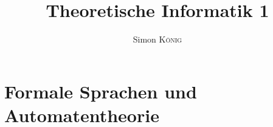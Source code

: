 \documentclass[orange]{simonkoenigzusammenfassung}
\title{Theoretische Informatik 1\\\subtitleformat{Zusammenfassung zum Modul Formale Sprachen und Automatentheorie}}
\author{Simon \textsc{König}}
\begin{document}
\maketitle
\tableofcontents

\part{Formale Sprachen und Automatentheorie}

\end{document}
